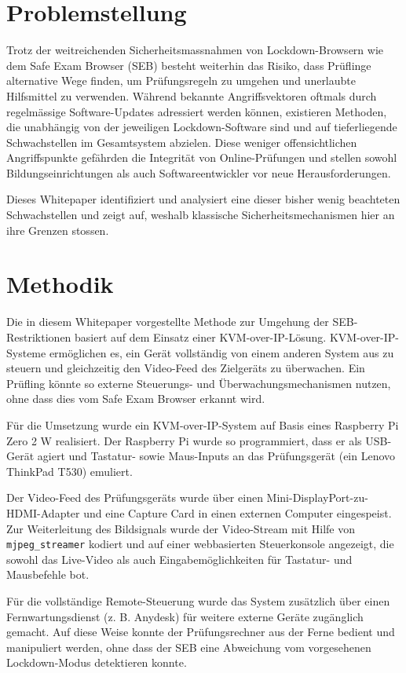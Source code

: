 \documentclass[14pt]{article}
\begin{document}
\section{Problemstellung}
Trotz der weitreichenden Sicherheitsmassnahmen von Lockdown-Browsern wie dem Safe Exam Browser (SEB) besteht weiterhin das Risiko, dass Prüflinge alternative Wege finden, um Prüfungsregeln zu umgehen und unerlaubte Hilfsmittel zu verwenden. Während bekannte Angriffsvektoren oftmals durch regelmässige Software-Updates adressiert werden können, existieren Methoden, die unabhängig von der jeweiligen Lockdown-Software sind und auf tieferliegende Schwachstellen im Gesamtsystem abzielen. Diese weniger offensichtlichen Angriffspunkte gefährden die Integrität von Online-Prüfungen und stellen sowohl Bildungseinrichtungen als auch Softwareentwickler vor neue Herausforderungen.

Dieses Whitepaper identifiziert und analysiert eine dieser bisher wenig beachteten Schwachstellen und zeigt auf, weshalb klassische Sicherheitsmechanismen hier an ihre Grenzen stossen.

\section{Methodik}

Die in diesem Whitepaper vorgestellte Methode zur Umgehung der SEB-Restriktionen basiert auf dem Einsatz einer KVM-over-IP-Lösung. KVM-over-IP-Systeme ermöglichen es, ein Gerät vollständig von einem anderen System aus zu steuern und gleichzeitig den Video-Feed des Zielgeräts zu überwachen. Ein Prüfling könnte so externe Steuerungs- und Überwachungsmechanismen nutzen, ohne dass dies vom Safe Exam Browser erkannt wird.

Für die Umsetzung wurde ein KVM-over-IP-System auf Basis eines Raspberry Pi Zero 2 W realisiert. Der Raspberry Pi wurde so programmiert, dass er als USB-Gerät agiert und Tastatur- sowie Maus-Inputs an das Prüfungsgerät (ein Lenovo ThinkPad T530) emuliert.

Der Video-Feed des Prüfungsgeräts wurde über einen Mini-DisplayPort-zu-HDMI-Adapter und eine Capture Card in einen externen Computer eingespeist. Zur Weiterleitung des Bildsignals wurde der Video-Stream mit Hilfe von \verb+mjpeg_streamer+ kodiert und auf einer webbasierten Steuerkonsole angezeigt, die sowohl das Live-Video als auch Eingabemöglichkeiten für Tastatur- und Mausbefehle bot.

Für die vollständige Remote-Steuerung wurde das System zusätzlich über einen Fernwartungsdienst (z. B. Anydesk) für weitere externe Geräte zugänglich gemacht. Auf diese Weise konnte der Prüfungsrechner aus der Ferne bedient und manipuliert werden, ohne dass der SEB eine Abweichung vom vorgesehenen Lockdown-Modus detektieren konnte.
\end{document}
